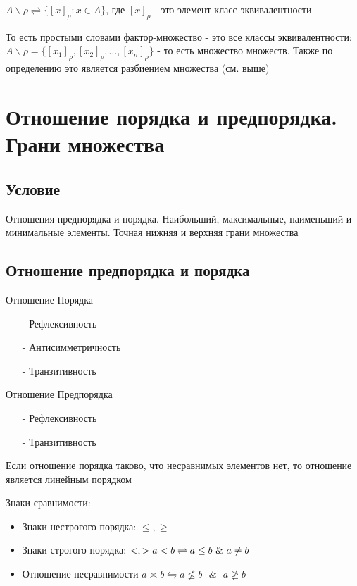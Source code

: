 \documentclass{report}
\newcommand{\band}{\mbox{ } \& \mbox{ }}
\begin{document}
$A\backslash\rho \rightleftharpoons \{[x]_{\rho}: x \in A\}$, где $[x]_{\rho}$ - это элемент класс эквивалентности

То есть простыми словами фактор-множество - это все классы эквивалентности:
$A\backslash\rho = \{[x_{1}]_{\rho}, [x_{2}]_{\rho}, \ldots, [x_{n}]_{\rho}\}$ - то есть множество множеств.
Также по определению это является разбиением множества (см. выше)
\newpage

\section{Отношение порядка и предпорядка. Грани множества}
\subsection{Условие}
Отношения предпорядка и порядка. Наибольший, максимальные, наименьший и
минимальные элементы. Точная нижняя и верхняя грани множества

\subsection{Отношение предпорядка и порядка}

Отношение Порядка
\begin{itemize}
	\item[-] Рефлексивность
	\item[-] Антисимметричность
	\item[-] Транзитивность
\end{itemize}
Отношение Предпорядка
\begin{itemize}
	\item[-] Рефлексивность
	\item[-] Транзитивность
\end{itemize}

Если отношение порядка таково, что несравнимых элементов нет, то отношение является линейным порядком

\medskip

Знаки сравнимости:
\begin{itemize}
	\item Знаки нестрогого порядка: $\leq, \geq$
	\item Знаки строгого порядка: $<, >\newline a < b \rightleftharpoons a \leq b \band a \neq b$
	\item Отношение несравнимости $a \asymp b \leftrightharpoons a \nleq b \band a \ngeq b$
\end{itemize}
\end{document}
